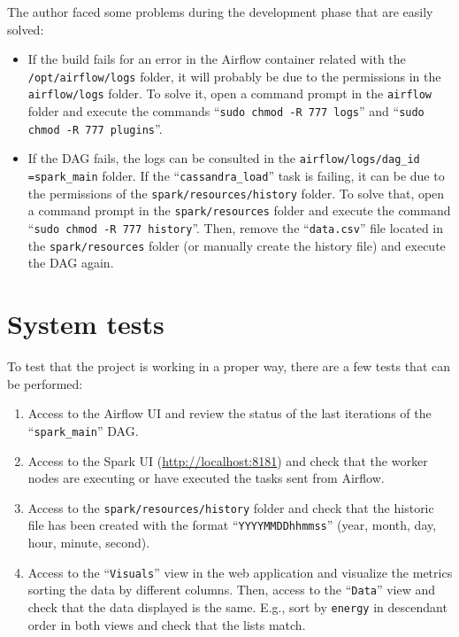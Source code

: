 \nonzeroparskip The author faced some problems during the development phase that are easily solved:
\begin{itemize}
	\item If the build fails for an error in the Airflow container related with the \texttt{/opt/airflow/logs} folder, it will probably be due to the permissions in the \texttt{airflow/logs} folder. To solve it, open a command prompt in the \texttt{airflow} folder and execute the commands ``\texttt{sudo chmod -R 777 logs}'' and ``\texttt{sudo chmod -R 777 plugins}''.
	\item If the DAG fails, the logs can be consulted in the \texttt{airflow/logs/dag\_id =spark\_main} folder. If the ``\texttt{cassandra\_load}'' task is failing, it can be due to the permissions of the \texttt{spark/resources/history} folder. To solve that, open a command prompt in the \texttt{spark/resources} folder and execute the command ``\texttt{sudo chmod -R 777 history}''. Then, remove the ``\texttt{data.csv}'' file located in the \texttt{spark/resources} folder (or manually create the history file) and execute the DAG again.
\end{itemize}

\section{System tests}
\nonzeroparskip To test that the project is working in a proper way, there are a few tests that can be performed:
\begin{enumerate}
	\item Access to the Airflow UI and review the status of the last iterations of the ``\texttt{spark\_main}'' DAG.
	\item Access to the Spark UI (\url{http://localhost:8181}) and check that the worker nodes are executing or have executed the tasks sent from Airflow.
	\item Access to the \texttt{spark/resources/history} folder and check that the historic file has been created with the format ``\texttt{YYYYMMDDhhmmss}'' (year, month, day, hour, minute, second).
	\item Access to the ``\texttt{Visuals}'' view in the web application and visualize the metrics sorting the data by different columns. Then, access to the ``\texttt{Data}'' view and check that the data displayed is the same. E.g., sort by \texttt{energy} in descendant order in both views and check that the lists match.
\end{enumerate}